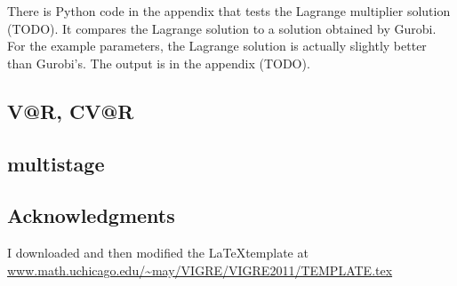 \documentclass{amsart}
\theoremstyle{definition}
\theoremstyle{remark}
\begin{document}
There is Python code in the appendix that tests the Lagrange multiplier solution (TODO). It compares the Lagrange solution to a solution obtained by Gurobi. For the example parameters, the Lagrange solution is actually slightly better than Gurobi's. The output is in the appendix (TODO).

\subsection{V@R, CV@R}


\subsection{multistage}

\subsection*{Acknowledgments}  I downloaded and then modified the \LaTeX template at \url{www.math.uchicago.edu/~may/VIGRE/VIGRE2011/TEMPLATE.tex}



\end{document}
